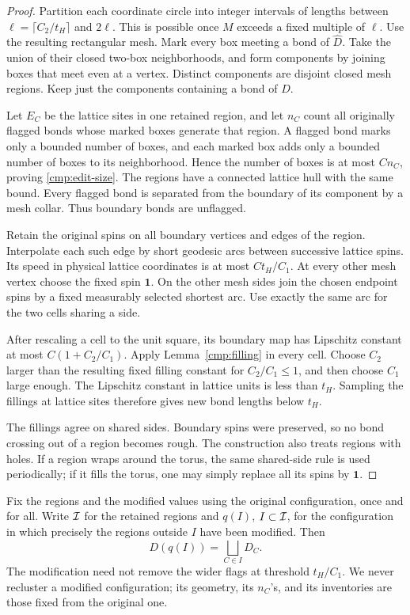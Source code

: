 \begin{proof}
Partition each coordinate circle into integer intervals of lengths
between \(\ell=\lceil C_2/t_H\rceil\) and \(2\ell\).  This is possible
once \(M\) exceeds a fixed multiple of \(\ell\).  Use the resulting
rectangular mesh.  Mark every box meeting a bond of \(\widehat D\).
Take the union of their closed two-box neighborhoods, and form
components by joining boxes that meet even at a vertex.  Distinct
components are disjoint closed mesh regions.  Keep just the components
containing a bond of \(D\).

Let \(E_C\) be the lattice sites in one retained region, and let \(n_C\)
count all originally flagged bonds whose marked boxes generate that
region.  A flagged bond marks only a bounded number of boxes, and each
marked box adds only a bounded number of boxes to its neighborhood.
Hence the number of boxes is at most \(Cn_C\), proving
\eqref{cmp:edit-size}.  The regions have a connected lattice hull with
the same bound.  Every flagged bond is separated from the boundary of
its component by a mesh collar.  Thus boundary bonds are unflagged.

Retain the original spins on all boundary vertices and edges of the
region.  Interpolate each such edge by short geodesic arcs between
successive lattice spins.  Its speed in physical lattice coordinates
is at most \(Ct_H/C_1\).  At every other mesh vertex choose the fixed
spin \(\mathbf1\).  On the other mesh sides join the chosen endpoint
spins by a fixed measurably selected shortest arc.  Use exactly the same
arc for the two cells sharing a side.

After rescaling a cell to the unit square, its boundary map has
Lipschitz constant at most \(C(1+C_2/C_1)\).  Apply
Lemma~\ref{cmp:filling} in every cell.  Choose \(C_2\) larger than the
resulting fixed filling constant for \(C_2/C_1\le1\), and then choose
\(C_1\) large enough.  The Lipschitz constant in lattice units is less
than \(t_H\).  Sampling the fillings at lattice sites therefore gives
new bond lengths below \(t_H\).

The fillings agree on shared sides.  Boundary spins were preserved,
so no bond crossing out of a region becomes rough.  The construction
also treats regions with holes.  If a region wraps around the torus,
the same shared-side rule is used periodically; if it fills the torus,
one may simply replace all its spins by \(\mathbf1\).
\end{proof}

Fix the regions and the modified values using the original
configuration, once and for all.  Write \({\cal I}\) for the retained
regions and \(q(I)\), \(I\subset{\cal I}\), for the configuration in
which precisely the regions outside \(I\) have been modified.  Then
\begin{equation}
 D(q(I))=\bigsqcup_{C\in I}D_C.
 \label{cmp:inventory-after-edit}
\end{equation}
The modification need not remove the wider flags at threshold
\(t_H/C_1\).  We never recluster a modified configuration; its geometry,
its \(n_C\)'s, and its inventories are those fixed from the original one.

